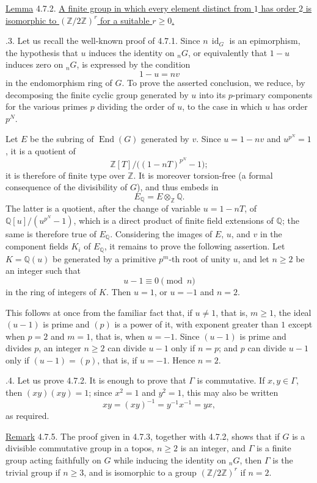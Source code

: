 \medskip
\noindent
\underline{Lemma} 4.7.2. \underline{A finite group in which every
element distinct from $1$ has order $2$ is isomorphic to
$(\mathbb Z/2\mathbb Z)^r$ for a suitable $r\geq0$.}

\smallskip
{}.3. Let us recall the well-known proof of 4.7.1.  Since
$n\,\operatorname{id}_G$ is an epimorphism, the hypothesis that $u$
induces the identity on ${}_nG$, or equivalently that $1-u$ induces zero
on ${}_nG$, is expressed by the condition
\[
 1-u=nv
\]
in the endomorphism ring of $G$.  To prove the asserted conclusion, we
reduce, by decomposing the finite cyclic group generated by $u$ into its
$p$-primary components for the various primes $p$ dividing the order of
$u$, to the case in which $u$ has order $p^N$.

Let $E$ be the subring of $\operatorname{End}(G)$ generated by $v$.
Since $u=1-nv$ and $u^{p^N}=1$, it is a quotient of
\[
 \mathbb Z[T]\big/\bigl((1-nT)^{p^N}-1\bigr);
\]
it is therefore of finite type over $\mathbb Z$.  It is moreover
torsion-free (a formal consequence of the divisibility of $G$), and thus
embeds in
\[
 E_{\mathbb Q}=E\otimes_{\mathbb Z}\mathbb Q.
\]
The latter is a quotient, after the change of variable $u=1-nT$, of
$\mathbb Q[u]/(u^{p^N}-1)$, which is a direct product of finite field
extensions of $\mathbb Q$; the same is therefore true of $E_{\mathbb Q}$.
Considering the images of $E$, $u$, and $v$ in the component fields
$K_i$ of $E_{\mathbb Q}$, it remains to prove the following assertion.
Let $K=\mathbb Q(u)$ be generated by a primitive $p^m$-th root of unity
$u$, and let $n\geq2$ be an integer such that
\[
 u-1\equiv0\pmod n
\]
in the ring of integers of $K$.  Then $u=1$, or $u=-1$ and $n=2$.

This follows at once from the familiar fact that, if $u\neq1$, that is,
$m\geq1$, the ideal $(u-1)$ is prime and $(p)$ is a power of it, with
exponent greater than $1$ except when $p=2$ and $m=1$, that is, when
$u=-1$.  Since $(u-1)$ is prime and divides $p$, an integer $n\geq2$ can
divide $u-1$ only if $n=p$; and $p$ can divide $u-1$ only if
$(u-1)=(p)$, that is, if $u=-1$.  Hence $n=2$.

\smallskip
{}.4. Let us prove 4.7.2.  It is enough to prove that $\Gamma$ is
commutative.  If $x,y\in\Gamma$, then $(xy)(xy)=1$; since $x^2=1$ and
$y^2=1$, this may also be written
\[
 xy=(xy)^{-1}=y^{-1}x^{-1}=yx,
\]
as required.

\medskip
\noindent
\underline{Remark} 4.7.5. The proof given in 4.7.3, together with
4.7.2, shows that if $G$ is a divisible commutative group in a topos,
$n\geq2$ is an integer, and $\Gamma$ is a finite group acting faithfully
on $G$ while inducing the identity on ${}_nG$, then $\Gamma$ is the
trivial group if $n\geq3$, and is isomorphic to a group
$(\mathbb Z/2\mathbb Z)^r$ if $n=2$.
